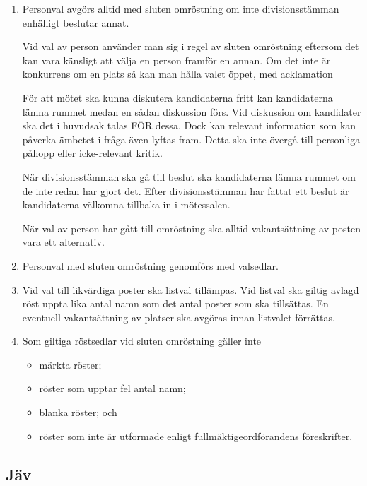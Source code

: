 \documentclass{dvd}
\begin{document}
\begin{enumerate}[label=\arabic* §, ref=\arabic*]
	\item Personval avgörs alltid med sluten omröstning om inte divisionsstämman enhälligt beslutar annat.

	      Vid val av person använder man sig i regel av sluten omröstning eftersom det kan vara känsligt att välja en person framför en annan.
	      Om det inte är konkurrens om en plats så kan man hålla valet öppet, med acklamation

	      För att mötet ska kunna diskutera kandidaterna fritt kan kandidaterna lämna rummet medan en sådan diskussion förs.
	      Vid diskussion om kandidater ska det i huvudsak talas FÖR dessa.
	      Dock kan relevant information som kan påverka ämbetet i fråga även lyftas fram.
	      Detta ska inte övergå till personliga påhopp eller icke-relevant kritik.

	      När divisionsstämman ska gå till beslut ska kandidaterna lämna rummet om de inte redan har gjort det.
	      Efter divisionsstämman har fattat ett beslut är kandidaterna välkomna tillbaka in i mötessalen.

	      När val av person har gått till omröstning ska alltid vakantsättning av posten vara ett alternativ.

	\item Personval med sluten omröstning genomförs med valsedlar.

	\item Vid val till likvärdiga poster ska listval tillämpas.
	      Vid listval ska giltig avlagd röst uppta lika antal namn som det antal poster som ska tillsättas.
	      En eventuell vakantsättning av platser ska avgöras innan listvalet förrättas.

	\item Som giltiga röstsedlar vid sluten omröstning gäller inte

	      \begin{itemize}
		      \item märkta röster;
		      \item röster som upptar fel antal namn;
		      \item blanka röster; och
		      \item röster som inte är utformade enligt fullmäktigeordförandens föreskrifter.
	      \end{itemize}
\end{enumerate}

\subsection{Jäv}
\end{document}
